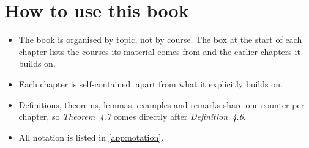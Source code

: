 \section*{How to use this book}
\begin{itemize}
  \item The book is organised by topic, not by course. The box at the start of each chapter lists the courses its material comes from and the earlier chapters it builds on.
  \item Each chapter is self-contained, apart from what it explicitly builds on.
  \item Definitions, theorems, lemmas, examples and remarks share one counter per chapter, so \emph{Theorem~4.7} comes directly after \emph{Definition~4.6}.
  \item All notation is listed in \cref{app:notation}.
\end{itemize}
